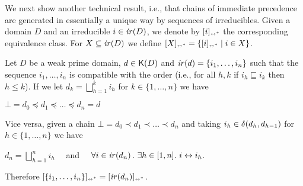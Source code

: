 We next show another technical result, i.e., that chains of immediate
precedence are generated in essentially a unique way by sequences of
irreducibles. Given a domain $D$ and an irreducible $i \in \mathop{\mathit{ir}({D})}$, we
denote by $[{i}]_{\scriptscriptstyle {\leftrightarrow^*}}$ the corresponding equivalence class. For
$X \subseteq \mathop{\mathit{ir}({D})}$ we define
$[{X}]_{\scriptscriptstyle {\leftrightarrow^*}} = \{ [{i}]_{\scriptscriptstyle {\leftrightarrow^*}} \mid i \in X \}$.

\begin{lemma}
  \label{le:chains}
  Let $D$ be a weak prime domain, $d \in \mathop{\mathsf{K}({D})}$ and
  $\mathop{\mathit{ir}({d})} = \{ i_1, \ldots, i_n \}$ such that the sequence
  $i_1, \ldots, i_n$ is compatible with the order (i.e., for all
  $h, k$ if $i_h \sqsubseteq i_k$ then $h \leq k$). If we let
  $d_k = \bigsqcup_{h = 1}^k i_h$ for $k \in \{ 1, \ldots, n\}$ we
  have
  \begin{center}
    $\bot = d_0 \preceq  d_1 \preceq \ldots \preceq d_n =d$
  \end{center}
  
  Vice versa, given a chain
  $\bot = d_0\prec d_1\prec \ldots\prec d_n$ and taking
  $i_h \in \delta({d_h},{d_{h-1}})$ for
  $h \in \{ 1, \ldots, n\}$ we have
  \begin{center}
    $d_n = \bigsqcup_{h=1}^n i_h$ \ \ and \ \
    $\forall i \in \mathop{\mathit{ir}({d_n})}.\ \exists h \in [{1},{n}].\ i
    \leftrightarrow i_h$.
  \end{center}
  Therefore
  $[{\{i_1, \ldots, i_n \}}]_{\scriptscriptstyle {\leftrightarrow^*}} = [{\mathop{\mathit{ir}({d_n})}}]_{\scriptscriptstyle {\leftrightarrow^*}}$.
\end{lemma}


